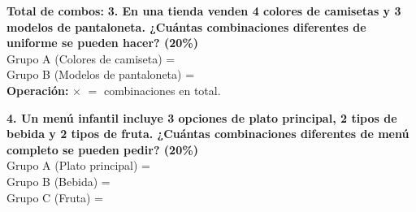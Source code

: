 \documentclass[12pt, letterpaper]{article}
\begin{document}
	
	\vspace{0.5cm}
	\begin{center}
	\end{center}
	\vspace{0.3cm}
	\noindent \textbf{Total de combos:} \underline{\hspace{2cm}}
	\vspace{0.8cm}
	\newpage
	\noindent \textbf{3.  En una tienda venden 4 colores de camisetas y 3 modelos de pantaloneta. ¿Cuántas combinaciones diferentes de uniforme se pueden hacer? (20\%)} \\


	
	\vspace{0.3cm}
	\noindent Grupo A (Colores de camiseta) = \underline{\hspace{1cm}} \\
	\noindent Grupo B (Modelos de pantaloneta) = \underline{\hspace{1cm}} \\
	
	\vspace{0.2cm}
	\noindent \textbf{Operación:} \underline{\hspace{1cm}} $\times$ \underline{\hspace{1cm}} $=$ \underline{\hspace{1cm}} combinaciones en total.
	\vspace{0.8cm}
	
	\noindent \textbf{4. Un menú infantil incluye 3 opciones de plato principal, 2 tipos de bebida y 2 tipos de fruta. ¿Cuántas combinaciones diferentes de menú completo se pueden pedir? (20\%)} \\
	 
	
	\vspace{0.3cm}
	\noindent Grupo A (Plato principal) = \underline{\hspace{1cm}} \\
	\noindent Grupo B (Bebida) = \underline{\hspace{1cm}} \\
	\noindent Grupo C (Fruta) = \underline{\hspace{1cm}} \\
	
\end{document}
